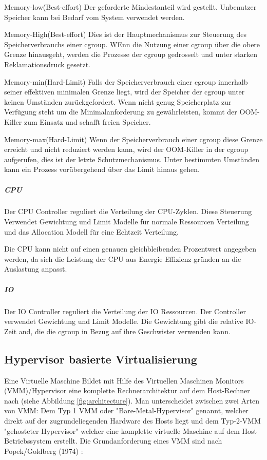 Memory-low(Best-effort)
Der geforderte Mindestanteil wird gestellt. Unbenutzer Speicher kann bei Bedarf vom System verwendet werden.

Memory-High(Best-effort)
Dies ist der Hauptmechanismus zur Steuerung des Speicherverbrauchs einer cgroup. WEnn die Nutzung einer cgroup über die obere Grenze hinausgeht, werden die Prozesse der cgroup gedrosselt und unter starken Reklamationsdruck gesetzt.

Memory-min(Hard-Limit)
Falls der Speicherverbrauch einer cgroup innerhalb seiner effektiven minimalen Grenze liegt, wird der Speicher der cgroup unter keinen Umständen zurückgefordert. Wenn nicht genug Speicherplatz zur Verfügung steht um die Minimalanforderung zu gewährleisten, kommt der OOM-Killer zum Einsatz und schafft freien Speicher.

Memory-max(Hard-Limit)
Wenn der Speicherverbrauch einer cgroup diese Grenze erreicht und nicht reduziert werden kann, wird der OOM-Killer in der cgroup aufgerufen, dies ist der letzte Schutzmechanismus. Unter bestimmten Umständen kann ein Prozess vorübergehend über das Limit hinaus gehen.

\subparagraph{CPU}
Der CPU Controller reguliert die Verteilung der CPU-Zyklen. Diese Steuerung Verwendet Gewichtung und Limit Modelle für normale Ressourcen Verteilung und das Allocation Modell für eine Echtzeit Verteilung.

Die CPU kann nicht auf einen genauen gleichbleibenden Prozentwert angegeben werden, da sich die Leistung der CPU aus Energie Effizienz gründen an die Auslastung anpasst.

\subparagraph{IO}
Der IO Controller reguliert die Verteilung der IO Ressourcen. Der Controller verwendet Gewichtung und Limit Modelle. Die Gewichtung gibt die relative IO-Zeit and, die die cgroup in Bezug auf ihre Geschwister verwenden kann.

\pagebreak
\subsection{Hypervisor basierte Virtualisierung}
Eine Virtuelle Maschine Bildet mit Hilfe des Virtuellen Maschinen Monitors (VMM)/Hypervisor eine komplette Rechnerarchitektur auf dem Host-Rechner nach (siehe Abbildung \ref{fig:architecture}). Man unterscheidet zwischen zwei Arten von VMM: Dem Typ 1 VMM oder "Bare-Metal-Hypervisor" genannt, welcher direkt auf der zugrundeliegenden Hardware des Hosts liegt und dem Typ-2-VMM "gehosteter Hypervisor" welcher eine komplette virtuelle Maschine auf dem Host Betriebssystem erstellt. Die Grundanforderung eines VMM sind nach Popek/Goldberg (1974) \cite{Popek1974FormalArchitectures,Glatz2015Betriebssysteme} :

